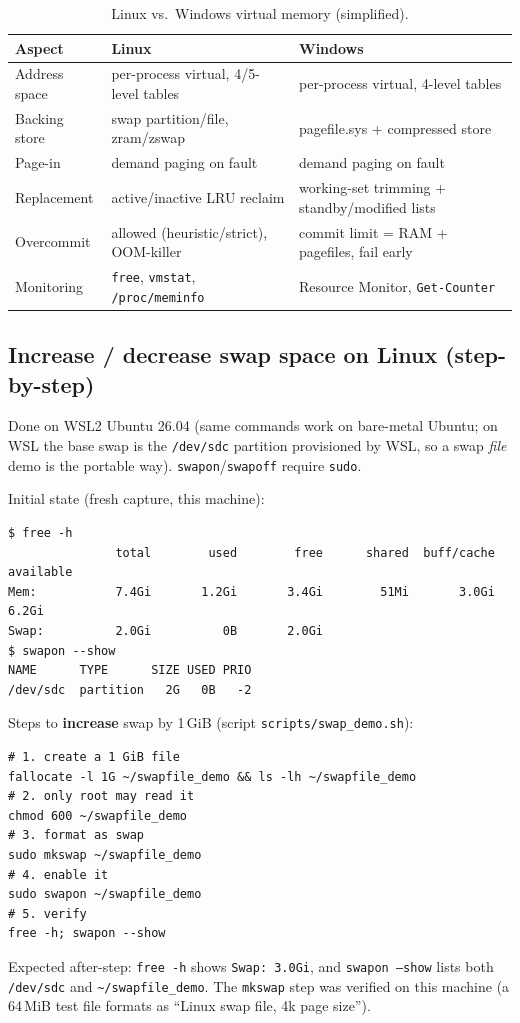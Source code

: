 \documentclass[a4paper,11pt]{article}
\begin{document}
\begin{table}[H]
\centering
\caption{Linux vs.\ Windows virtual memory (simplified).}
\begin{tabular}{@{}lll@{}}
\toprule
Aspect & Linux & Windows \\
\midrule
Address space & per-process virtual, 4/5-level tables & per-process virtual, 4-level tables \\
Backing store & swap partition/file, zram/zswap & pagefile.sys + compressed store \\
Page-in & demand paging on fault & demand paging on fault \\
Replacement & active/inactive LRU reclaim & working-set trimming + standby/modified lists \\
Overcommit & allowed (heuristic/strict), OOM-killer & commit limit = RAM + pagefiles, fail early \\
Monitoring & \texttt{free}, \texttt{vmstat}, \texttt{/proc/meminfo} & Resource Monitor, \texttt{Get-Counter} \\
\bottomrule
\end{tabular}
\end{table}

\subsection{Increase / decrease swap space on Linux (step-by-step)}
Done on WSL2 Ubuntu 26.04 (same commands work on bare-metal Ubuntu; on WSL the base swap is the \texttt{/dev/sdc} partition provisioned by WSL, so a swap \textit{file} demo is the portable way). \texttt{swapon}/\texttt{swapoff} require \texttt{sudo}.

Initial state (fresh capture, this machine):
\begin{lstlisting}[caption={Before: free and swapon}]
$ free -h
               total        used        free      shared  buff/cache   available
Mem:           7.4Gi       1.2Gi       3.4Gi        51Mi       3.0Gi       6.2Gi
Swap:          2.0Gi          0B       2.0Gi
$ swapon --show
NAME      TYPE      SIZE USED PRIO
/dev/sdc  partition   2G   0B   -2
\end{lstlisting}

Steps to \textbf{increase} swap by 1\,GiB (script \texttt{scripts/swap\_demo.sh}):
\begin{lstlisting}[caption={Increase swap}]
# 1. create a 1 GiB file
fallocate -l 1G ~/swapfile_demo && ls -lh ~/swapfile_demo
# 2. only root may read it
chmod 600 ~/swapfile_demo
# 3. format as swap
sudo mkswap ~/swapfile_demo
# 4. enable it
sudo swapon ~/swapfile_demo
# 5. verify
free -h; swapon --show
\end{lstlisting}
Expected after-step: \texttt{free -h} shows \texttt{Swap: 3.0Gi}, and \texttt{swapon --show} lists both \texttt{/dev/sdc} and \texttt{\textasciitilde/swapfile\_demo}. The \texttt{mkswap} step was verified on this machine (a 64\,MiB test file formats as ``Linux swap file, 4k page size'').
\end{document}
